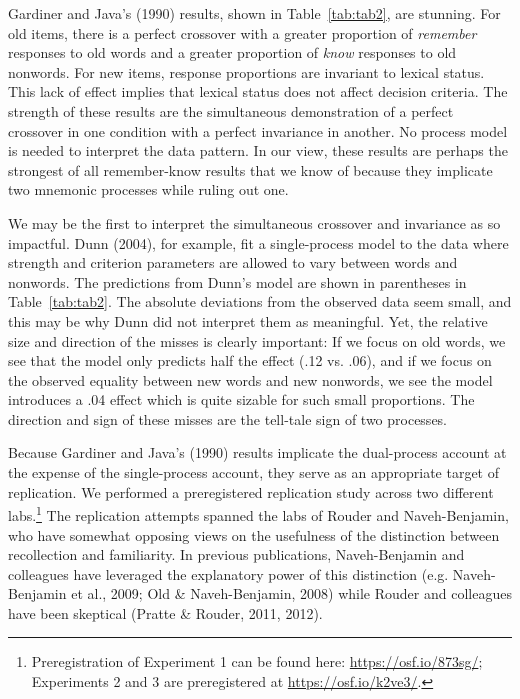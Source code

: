 \documentclass[english,,man]{apa6}
\let\rmarkdownfootnote\footnote%
\def\footnote{\protect\rmarkdownfootnote}
\begin{document}
Gardiner and Java's (1990) results, shown in Table~\ref{tab:tab2}, are stunning. For old items, there is a perfect crossover with a greater proportion of \emph{remember} responses to old words and a greater proportion of \emph{know} responses to old nonwords. For new items, response proportions are invariant to lexical status. This lack of effect implies that lexical status does not affect decision criteria. The strength of these results are the simultaneous demonstration of a perfect crossover in one condition with a perfect invariance in another. No process model is needed to interpret the data pattern. In our view, these results are perhaps the strongest of all remember-know results that we know of because they implicate two mnemonic processes while ruling out one.

We may be the first to interpret the simultaneous crossover and invariance as so impactful. Dunn (2004), for example, fit a single-process model to the data where strength and criterion parameters are allowed to vary between words and nonwords. The predictions from Dunn's model are shown in parentheses in Table~\ref{tab:tab2}. The absolute deviations from the observed data seem small, and this may be why Dunn did not interpret them as meaningful. Yet, the relative size and direction of the misses is clearly important: If we focus on old words, we see that the model only predicts half the effect (.12 vs. .06), and if we focus on the observed equality between new words and new nonwords, we see the model introduces a .04 effect which is quite sizable for such small proportions. The direction and sign of these misses are the tell-tale sign of two processes.

Because Gardiner and Java's (1990) results implicate the dual-process account at the expense of the single-process account, they serve as an appropriate target of replication. We performed a preregistered replication study across two different labs.\footnote{Preregistration of Experiment 1 can be found here: \url{https://osf.io/873sg/}; Experiments 2 and 3 are preregistered at \url{https://osf.io/k2ve3/}.} The replication attempts spanned the labs of Rouder and Naveh-Benjamin, who have somewhat opposing views on the usefulness of the distinction between recollection and familiarity. In previous publications, Naveh-Benjamin and colleagues have leveraged the explanatory power of this distinction (e.g. Naveh-Benjamin et al., 2009; Old \& Naveh-Benjamin, 2008) while Rouder and colleagues have been skeptical (Pratte \& Rouder, 2011, 2012).
\end{document}
